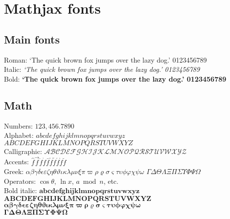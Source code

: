 \documentclass[12pt]{article}
\begin{document}
\section{Mathjax fonts}

\subsection{Main fonts}
Roman: `The quick brown fox jumps over the lazy dog.' 0123456789\\
Italic: \textit{`The quick brown fox jumps over the lazy dog.' 0123456789}\\
Bold: \textbf{`The quick brown fox jumps over the lazy dog.' 0123456789}

\subsection{Math}
Numbers: $123,456.7890$\\
Alphabet: $abcdefghijklmnopqrstuvwxyz$ $ABCDEFGHIJKLMNOPQRSTUVWXYZ$\\
Calligraphic: $\mathcal{ABCDEFGHIJKLMNOPQRSTUVWXYZ}$\\
Accents: $\hat f \vec f \ddot f \dot f \bar f\check f \tilde f \acute f \grave f \breve f$\\
Greek: $\alpha \beta \gamma \delta \epsilon \varepsilon \zeta \eta \theta \vartheta \iota \kappa \lambda \mu \nu \xi \pi \varpi \rho \varrho \sigma \varsigma \tau \upsilon \phi \varphi \chi \psi \omega$
$\Gamma \Delta \Theta \Lambda \Xi \Pi \Sigma \Upsilon \Phi \Psi \Omega$\\
Operators: $\cos\theta$, $\ln x$, $a \bmod n$, etc.\\
Bold italic: $\mathbold{abcdefghijklmnopqrstuvwxyz}$\\
	$\mathbold{ABCDEFGHIJKLMNOPQRSTUVWXYZ}$\\
	$\mathbold{\alpha \beta \gamma \delta \epsilon \varepsilon \zeta \eta \theta \vartheta \iota \kappa \lambda \mu \nu \xi \pi \varpi \rho \varrho \sigma \varsigma \tau \upsilon \phi \varphi \chi \psi \omega}$\\
	$\mathbold{\Gamma \Delta \Theta \Lambda \Xi \Pi \Sigma \Upsilon \Phi \Psi \Omega}$
\end{document}

